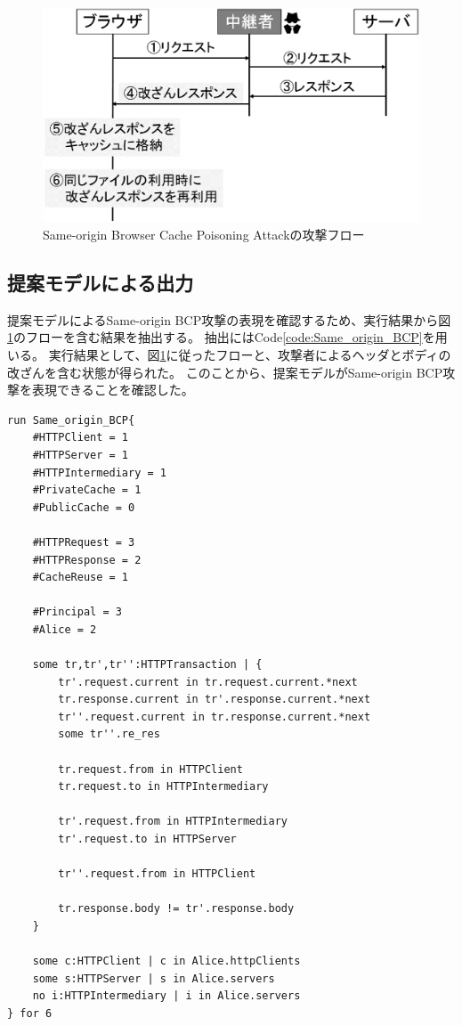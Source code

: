 \documentclass[12pt,a4paper]{jbook}
\begin{document}
\begin{figure}[htb]
\centering
\includegraphics[width=400pt]{./fig/SameBCP_flow.eps}
\caption{Same-origin Browser Cache Poisoning Attackの攻撃フロー}
\label{fig:SameBCP_flow}
\end{figure}

\subsection{提案モデルによる出力}
提案モデルによるSame-origin BCP攻撃の表現を確認するため、実行結果から図\ref{fig:SameBCP_flow}のフローを含む結果を抽出する。
抽出にはCode\ref{code:Same_origin_BCP}を用いる。
実行結果として、図\ref{fig:SameBCP_flow}に従ったフローと、攻撃者によるヘッダとボディの改ざんを含む状態が得られた。
このことから、提案モデルがSame-origin BCP攻撃を表現できることを確認した。

\begin{lstlisting}[caption=Same-origin BCP攻撃の表現, label=code:Same_origin_BCP]
run Same_origin_BCP{
	#HTTPClient = 1
	#HTTPServer = 1
	#HTTPIntermediary = 1
	#PrivateCache = 1
	#PublicCache = 0

	#HTTPRequest = 3
	#HTTPResponse = 2
	#CacheReuse = 1

	#Principal = 3
	#Alice = 2

	some tr,tr',tr'':HTTPTransaction | {
		tr'.request.current in tr.request.current.*next
		tr.response.current in tr'.response.current.*next
		tr''.request.current in tr.response.current.*next
		some tr''.re_res

		tr.request.from in HTTPClient
		tr.request.to in HTTPIntermediary

		tr'.request.from in HTTPIntermediary
		tr'.request.to in HTTPServer

		tr''.request.from in HTTPClient

		tr.response.body != tr'.response.body
	}

	some c:HTTPClient | c in Alice.httpClients
	some s:HTTPServer | s in Alice.servers
	no i:HTTPIntermediary | i in Alice.servers
} for 6
\end{lstlisting}
\end{document}
